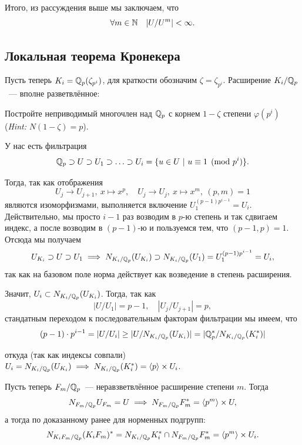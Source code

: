 	Итого, из рассуждения выше мы заключаем, что 
	\[
		\forall m \in \mathbb{N} \quad |U/U^m| < \infty.
	\]

	\subsection{Локальная теорема Кронекера}

	Пусть теперь $K_i = \mathbb{Q}_{p}(\zeta_{p^i})$, для краткости обозначим $\zeta = \zeta_{p^i}$. Расширение $K_i/\mathbb{Q}_p$~--- вполне разветвлённое: 

	\begin{exercise}
		Постройте неприводимый многочлен над $\mathbb{Q}_{p}$ с корнем $1 - \zeta$ степени $\varphi(p^i)$ (\emph{Hint:} $N(1 - \zeta) = p$).		 
	\end{exercise}

	У нас есть фильтрация 
	\[
		\mathbb{Q}_p \supset U \supset U_1 \supset \ldots \supset U_i = \{ u \in U \ \vert \ u \equiv 1 \pmod{p^i} \}.
	\]

	Тогда, так как отображения 
	\[
		U_{j} \to U_{j + 1}, \ x \mapsto x^p, \quad U_{j} \to U_{j}, \ x \mapsto x^m,  \ (p, m) = 1
	\]
	являются изоморфизмами, выполняется включение $U_1^{(p - 1)p^{i - 1}} = U_i$. Действительно, мы просто $i - 1$ раз возводим в $p$-ю степень и так сдвигаем индекс, а после возводим в $(p - 1)$-ю и пользуемся тем, что $(p - 1, p) = 1$.  Отсюда мы получаем 
	\[
		U_{K_i} \supset U \supset U_1 \implies N_{K_{i}/\mathbb{Q}_p}(U_{K_i}) \supset N_{K_i/\mathbb{Q}_p}(U_1) = U_{1}^{(p - 1)p^{i - 1}} = U_i,
	\]
	так как на базовом поле норма действует как возведение в степень расширения. 

	Значит, $U_i \subset N_{K_i/\mathbb{Q}_p}(U_{K_i})$. Тогда, так как 
	\[
		|U/U_1| = p - 1, \quad |U_j/U_{j + 1}| =  p,
	\]
	стандатным переходом к последовательным факторам фильтрации мы имеем, что 
	\[
		(p - 1) \cdot p^{i - 1} = |U/U_i| \ge |U/N_{K_i/\mathbb{Q}_p}(U_{K_i})| = |\mathbb{Q}_{p}^*/N_{K_i/\mathbb{Q}_p}(K_i^*)| 
	\]


	откуда (так как индексы совпали) $U_i = N_{K_i/\mathbb{Q}_{p}}(U_{K_i}) \implies N_{K_i/\mathbb{Q}_p}(K_i^*) = \langle p \rangle \times U_i$. 



	Пусть теперь $F_m/\mathbb{Q}_p$~--- неравзветвлённое расширение степени $m$. Тогда 
	\[
		N_{F_m/\mathbb{Q}_p} U_{F_m} = U \implies N_{F_m/\mathbb{Q}_p} F_m^* = \langle p^m \rangle \times U,
	\]
	а тогда  по доказанному ранее для норменных подгрупп: 
	\[
		N_{K_i F_m/\mathbb{Q}_p}(K_i F_m)^* = N_{K_i/\mathbb{Q}_p}{K_i^*} \cap N_{F_m/\mathbb{Q}_p} F_m^*	= \langle p^m \rangle \times  U_i.
	\]

